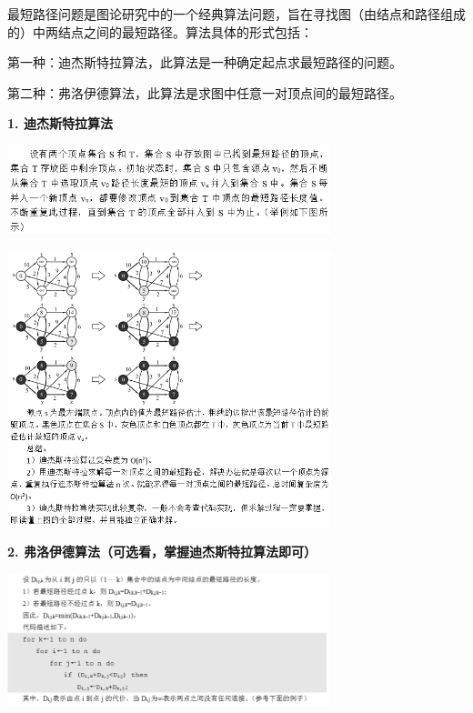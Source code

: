 {最短路径问题是图论研究中的一个经典算法问题，{旨在寻找图（由结点和路径组成的）中两结点之间的最短路径}。算法具体的形式包括：}

{{第一种：}{迪杰斯特拉算法}{，}此算法是一种}{确定起点求最短路径的问题。}

{{{第二种：}{弗洛伊德算法}{，}此算法是求图中任意一对顶点间的最短路径。}}

{\textbf{1. 迪杰斯特拉算法}}

\includegraphics[width=3.70833in,height=1.02083in]{png-jpeg-pics/F5BB29135CB5BF3A38D4436EC07F7F87.png}

{}

{\includegraphics[width=3.70833in,height=3.14583in]{png-jpeg-pics/5A3D0661340FA3AE873B2E5D0908E9F7.png}\\
}

{\textbf{2. 弗洛伊德算法（可选看，掌握\textbf{迪杰斯特拉算法}即可）}}

{\textbf{\includegraphics[width=3.70833in,height=1.51042in]{png-jpeg-pics/100728F2DD647E5541BAE5A9650BCE86.png}\\
}}

